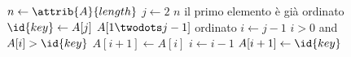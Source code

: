 \begin{codebox}
\li $n \gets \attrib{A}{length}$
\li \For $j \gets 2$ \To $n$
	\Comment il primo elemento è già ordinato
\li		\Do
			$\id{key} \gets A[j]$ 
			\Comment $A[1 \twodots j-1]$ ordinato
\li			$i \gets j-1$
\li			\While $i > 0$ and $A[i] > \id{key}$
\li				\Do
					$A[i+1] \gets A[i]$
\li					$i \gets i-1$
				\End
\li			$A[i+1] \gets \id{key}$
		\End
\end{codebox}